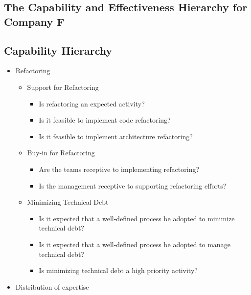 \begin{appendices}

\chapter{The Capability and Effectiveness Hierarchy for Company F}

\section{Capability Hierarchy} \label{sec:capability_hierarchy}
\begin{itemize}
	\item Refactoring
		\begin{itemize}
			\item Support for Refactoring 
				\begin{itemize}
					\item Is refactoring an expected activity?
					\item Is it feasible to implement code refactoring?
					\item Is it feasible to implement architecture refactoring?
				\end{itemize}
			\item Buy-in for Refactoring
				\begin{itemize}
					\item Are the teams receptive to implementing refactoring?
					\item Is the management receptive to supporting refactoring efforts?
				\end{itemize}
			\item Minimizing Technical Debt
				\begin{itemize}
					\item Is it expected that a well-defined process be adopted to minimize technical debt?
					\item Is it expected that a well-defined process be adopted to manage technical debt?
					\item Is minimizing technical debt a high priority activity?
				\end{itemize}
		\end{itemize}	
	\item Distribution of expertise
		\begin{itemize}

\end{itemize}
\end{itemize}
\end{appendices}
